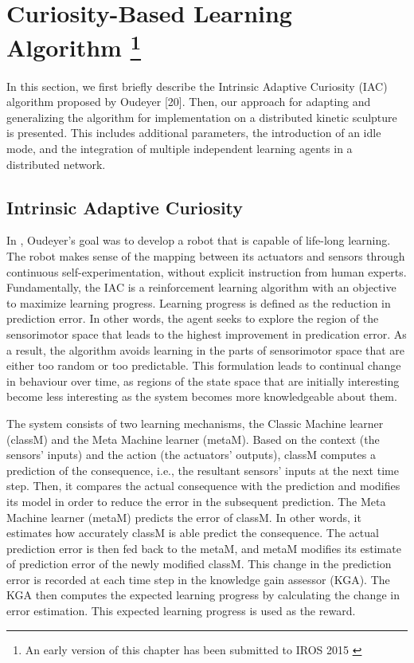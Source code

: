 \chapter[Curiosity-Based Learning Algorithm]
{Curiosity-Based Learning Algorithm \footnote{An early version of this chapter has been submitted to IROS 2015 \cite{Chan2015} }} 
\label{chap:cbla}
 
In this section, we first briefly describe the Intrinsic Adaptive Curiosity (IAC) algorithm proposed by Oudeyer [20]. Then, our approach for adapting and generalizing the algorithm for implementation on a distributed kinetic sculpture is presented. This includes additional parameters, the introduction of an idle mode, and the integration of multiple independent learning agents in a distributed network. 

\section{Intrinsic Adaptive Curiosity}

In \cite{Oudeyer2007}, Oudeyer's goal was to develop a robot that is capable of life-long learning. The robot makes sense of the mapping between its actuators and sensors through continuous self-experimentation, without explicit instruction from human experts. Fundamentally, the IAC is a reinforcement learning algorithm with an objective to maximize learning progress. Learning progress is defined as the reduction in prediction error. In other words, the agent seeks to explore the region of the sensorimotor space that leads to the highest improvement in predication error. As a result, the algorithm avoids learning in the parts of sensorimotor space that are either too random or too predictable. This formulation leads to continual change in behaviour over time, as regions of the state space that are initially interesting become less interesting as the system becomes more knowledgeable about them. 
 
The system consists of two learning mechanisms, the Classic Machine learner (classM) and the Meta Machine learner (metaM).  Based on the context (the sensors' inputs) and the action (the actuators' outputs), classM computes a prediction of the consequence, i.e., the resultant sensors' inputs at the next time step. Then, it compares the actual consequence with the prediction and modifies its model in order to reduce the error in the subsequent prediction. The Meta Machine learner (metaM) predicts the error of classM. In other words, it estimates how accurately classM is able predict the consequence. The actual prediction error is then fed back to the metaM, and metaM modifies its estimate of prediction error of the newly modified classM. This change in the prediction error is recorded at each time step in the knowledge gain assessor (KGA). The KGA then computes the expected learning progress by calculating the change in error estimation.  This expected learning progress is used as the reward. 

